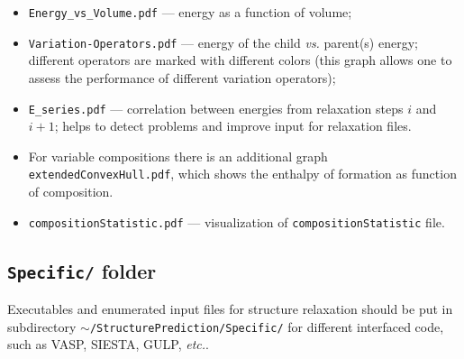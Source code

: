 \documentclass[12pt]{article}
\newcommand{\file}[1]{\texttt{#1}}
\begin{document}
\begin{itemize}
\begin{itemize}
\item \file{Energy\_vs\_Volume.pdf} --- energy as a function of volume; \item
\file{Variation-Operators.pdf} --- energy of the child \emph{vs.} parent(s)
energy; different operators are marked with different colors (this graph allows
one to assess the performance of different variation operators);

\item \file{E\_series.pdf} --- correlation between energies from relaxation
steps $i$ and $i+1$; helps to detect problems and improve input for relaxation
files.

\item For variable compositions there is an additional graph
\file{extendedConvexHull.pdf}, which shows the enthalpy of formation as function
of composition.

\item \file{compositionStatistic.pdf} --- visualization of
\file{compositionStatistic} file.

\end{itemize}

\end{itemize}


\subsection{\file{Specific/} folder}

Executables and enumerated input files for structure relaxation should be put
in subdirectory \file{$\sim$/StructurePrediction/Specific/} for different
interfaced code, such as VASP, SIESTA, GULP, \emph{etc.}.
\end{document}
